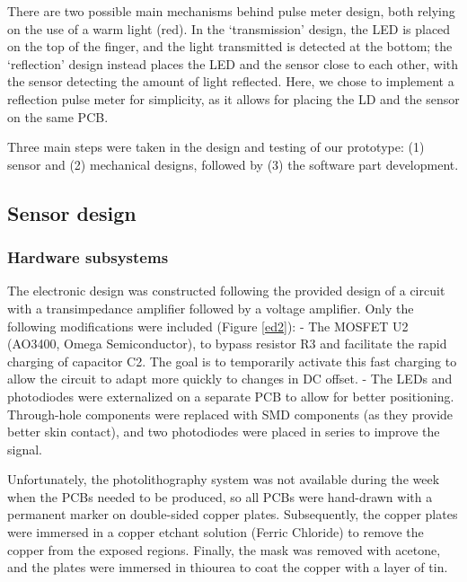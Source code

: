 \documentclass[conference]{IEEEtran}
\begin{document}
   There are two possible main mechanisms behind pulse meter design, both relying on the use of a warm light (red). In the `transmission’ design, the LED is placed on the top of the finger, and the light transmitted is detected at the bottom; the ‘reflection’ design instead places the LED and the sensor close to each other, with the sensor detecting the amount of light reflected. Here, we chose to implement a reflection pulse meter for simplicity, as it allows for placing the LD and the sensor on the same PCB. 
   
   Three main steps were taken in the design and testing of our prototype: (1) sensor and (2) mechanical designs, followed by (3) the software part development.
   
   \subsection{Sensor design}
      \subsubsection{Hardware subsystems}
      The electronic design was constructed following the provided design of a circuit with a transimpedance amplifier followed by a voltage amplifier.
      Only the following modifications were included (Figure \ref{ed2}):
         - The MOSFET U2 (AO3400, Omega Semiconductor), to bypass resistor R3 and facilitate the rapid charging of capacitor C2. The goal is to temporarily activate this fast charging to allow the circuit to adapt
         more quickly to changes in DC offset.
         - The LEDs and photodiodes were externalized on a separate PCB to allow for better positioning. Through-hole components were replaced with SMD components (as they provide better skin contact),
         and two photodiodes were placed in series to improve the signal.

      Unfortunately, the photolithography system was not available during the week when the PCBs needed to be produced, so all PCBs were hand-drawn with a permanent marker on double-sided copper plates.
      Subsequently, the copper plates were immersed in a copper etchant solution (Ferric Chloride) to remove the copper from the exposed regions. Finally, the mask was removed with acetone, and the plates were immersed in thiourea to coat the copper with a layer of tin.
\end{document}
